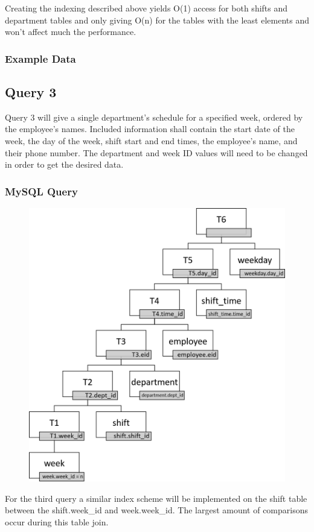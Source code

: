 \documentclass[letter,12pt]{texMemo}
\begin{document}
Creating the indexing described above yields O(1) access for both shifts and department tables and only giving O(n) for the tables with the least elements and won't affect much the performance.
\vspace{1em}
\subsubsection*{Example Data}
	

\subsection*{Query 3}
Query 3 will give a single department's schedule for a specified week, ordered by the employee's names. Included information shall contain the start date of the week, the day of the week, shift start and end times, the employee's name, and their phone number. The department and week ID values will need to be changed in order to get the desired data.\subsubsection*{MySQL Query}
	
\begin{figure}[H]
	\centering
	\includegraphics[width=.6\textwidth]{query3.png}
\end{figure}
For the third query a similar index scheme will be implemented on the shift table between the shift.week\_id and week.week\_id. The largest amount of comparisons occur during this table join. 
\end{document}

